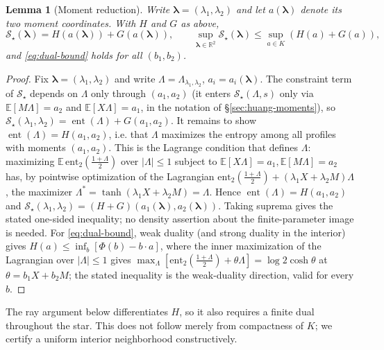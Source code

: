 \documentclass[11pt]{article}
\newtheorem{lemma}[theorem]{Lemma}
\newcommand{\R}{\mathbb{R}}
\newcommand{\E}{\mathbb{E}}
\DeclareMathOperator{\ent}{ent}
\begin{document}
\begin{lemma}[Moment reduction]\label{lem:moment}
Write $\boldsymbol\lambda=(\lambda_1,\lambda_2)$ and let
$a(\boldsymbol\lambda)$ denote its two moment coordinates. With $H$ and $G$
as above,
\[
  \mathcal S_\star(\boldsymbol\lambda)
  =H(a(\boldsymbol\lambda))+G(a(\boldsymbol\lambda)),
  \qquad
  \sup_{\boldsymbol\lambda\in\R^2}\mathcal S_\star(\boldsymbol\lambda)
  \le\sup_{a\in K}(H(a)+G(a)),
\]
and \eqref{eq:dual-bound} holds for all $(b_1,b_2)$.
\end{lemma}
\begin{proof}
Fix $\boldsymbol\lambda=(\lambda_1,\lambda_2)$ and write
$\Lambda=\Lambda_{\lambda_1,\lambda_2}$,
$a_i=a_i(\boldsymbol\lambda)$. The constraint term of $\mathcal S_\star$ depends on
$\Lambda$ only through $(a_1,a_2)$ (it enters
$\mathcal S_\star(\Lambda,s)$ only via $\E[M\Lambda]=a_2$ and
$\E[X\Lambda]=a_1$, in the notation of \S\ref{sec:huang-moments}), so
$\mathcal S_\star(\lambda_1,\lambda_2)=\ent(\Lambda)+G(a_1,a_2)$. It remains
to show $\ent(\Lambda)=H(a_1,a_2)$, i.e. that $\Lambda$ maximizes the entropy
among all profiles with moments $(a_1,a_2)$. This is the Lagrange condition
that defines $\Lambda$: maximizing $\E\,\mathrm{ent}_2(\tfrac{1+\Lambda}2)$
over $|\Lambda|\le1$ subject to $\E[X\Lambda]=a_1,\E[M\Lambda]=a_2$ has,
by pointwise optimization of the Lagrangian
$\mathrm{ent}_2(\tfrac{1+\Lambda}2)+(\lambda_1 X+\lambda_2 M)\Lambda$, the
maximizer $\Lambda^\ast=\tanh(\lambda_1 X+\lambda_2 M)=\Lambda$. Hence
$\ent(\Lambda)=H(a_1,a_2)$ and
$\mathcal S_\star(\lambda_1,\lambda_2)
=(H+G)(a_1(\boldsymbol\lambda),a_2(\boldsymbol\lambda))$.
Taking suprema gives the stated one-sided inequality; no density assertion
about the finite-parameter image is needed. For \eqref{eq:dual-bound}, weak
duality (and strong duality in the interior) gives
$H(a)\le\inf_b[\Phi(b)-b\cdot a]$, where the inner
maximization of the Lagrangian over $|\Lambda|\le1$ gives
$\max_\Lambda[\mathrm{ent}_2(\tfrac{1+\Lambda}2)+\theta\Lambda]=\log2\cosh\theta$
at $\theta=b_1X+b_2M$; the stated inequality is the weak-duality direction,
valid for every $b$.
\end{proof}

The ray argument below differentiates $H$, so it also requires a finite dual
throughout the star.  This does not follow merely from compactness of $K$; we
certify a uniform interior neighborhood constructively.
\end{document}
